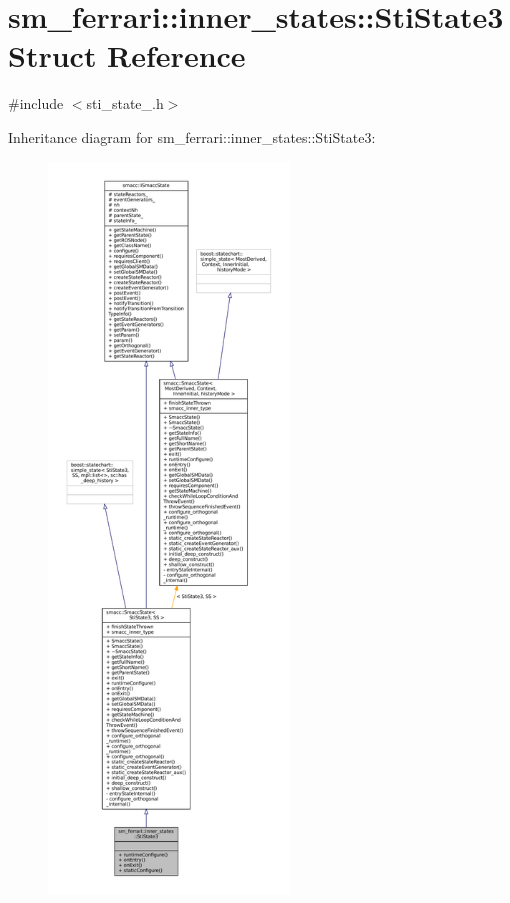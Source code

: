 \hypertarget{structsm__ferrari_1_1inner__states_1_1StiState3}{}\section{sm\+\_\+ferrari\+:\+:inner\+\_\+states\+:\+:Sti\+State3 Struct Reference}
\label{structsm__ferrari_1_1inner__states_1_1StiState3}


{\ttfamily \#include $<$sti\+\_\+state\+\_.\+h$>$}



Inheritance diagram for sm\+\_\+ferrari\+:\+:inner\+\_\+states\+:\+:Sti\+State3\+:
\nopagebreak
\begin{figure}[H]
\begin{center}
\leavevmode
\includegraphics[height=550pt]{structsm__ferrari_1_1inner__states_1_1StiState3__inherit__graph}
\end{center}
\end{figure}


